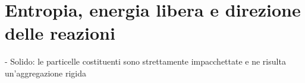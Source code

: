 \section{Entropia, energia libera e direzione delle reazioni}
- Solido: le particelle costituenti sono strettamente impacchettate e ne risulta un'aggregazione rigida
